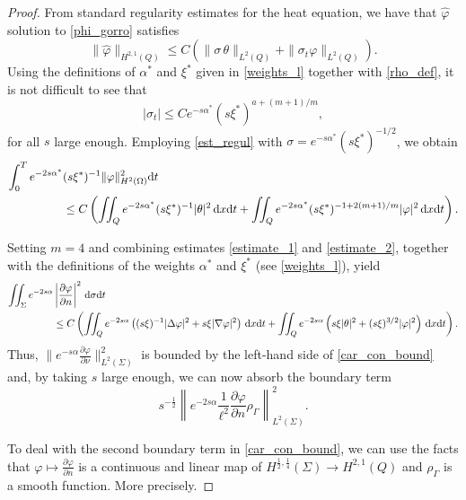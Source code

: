 \documentclass{aims}
\theoremstyle{definition}
\def\csbd{\rho_{\Gamma}}
\def\dx{\,\textnormal{d}x}
\def\dt{\textnormal{d}t}
\def\d{\,\textnormal{d}}
\begin{document}
\begin{proof}
From standard regularity estimates for the heat equation, we have that $\widehat{\varphi}$ solution to \eqref{phi_gorro} satisfies
%
\begin{equation}\label{est_regul}
\|\widehat{\varphi}\|_{H^{2,1}(Q)}\leq C\left(\|\sigma\,\theta\|_{L^2(Q)}+\|\sigma_t\varphi\|_{L^2(Q)}\right).
\end{equation}
%
Using the definitions of $\alpha^*$ and $\xi^*$ given in \eqref{weights_l} together with \eqref{rho_def}, it is not difficult to see that 
%
\begin{equation*}
|\sigma_t|\leq Ce^{-s\alpha^*}(s\xi^*)^{a+{(m+1)}/{m}},
\end{equation*}
%
for all $s$ large enough. Employing  \eqref{est_regul} with $\sigma=e^{-s\alpha^*}(s\xi^*)^{-1/2}$, we obtain
%
\begin{equation}\label{estimate_2}
\begin{split}
\int_{0}^T e^{-2s\alpha^*}&(s\xi^{*})^{-1}\|\varphi\|_{H^2(\Omega)}^2\dt \\
&\leq C\left(\iint_Qe^{-2s\alpha^*}(s\xi^*)^{-1}|\theta|^2\dx\dt+\iint_Qe^{-2s\alpha^*}(s\xi^*)^{-1+2(m+1)/m}|\varphi|^2\dx\dt\right).
\end{split}
\end{equation}

Setting $m=4$ and combining estimates \eqref{estimate_1} and \eqref{estimate_2}, together with the definitions of the weights $\alpha^*$ and $\xi^*$ (see \eqref{weights_l}), yield
%
\begin{equation*}
\begin{split}
\iint_{\Sigma}e^{-2s\alpha}&\left|\frac{\partial \varphi}{\partial n}\right|^2\d\sigma\dt\\
&\leq C\left(\iint_Q e^{-2s\alpha}\left((s\xi)^{-1}|\Delta \varphi|^2 + s\xi|\nabla \varphi|^2\right)\dx\dt+\iint_Qe^{-2s\alpha}\left(s\xi|\theta|^2+(s\xi)^{3/2}|\varphi|^2\right)\dx\dt\right).
\end{split}
\end{equation*}
%
Thus, $\|e^{-s\alpha}\frac{\partial \varphi}{\partial \nu}\|_{L^2(\Sigma)}^2$ is bounded by the left-hand side of \eqref{car_con_bound} and, by taking $s$ large enough, we can now absorb the boundary term 
%
\begin{equation*}
s^{-\frac{1}{2}}\left\| e^{-2s\alpha} \frac{1}{\ell^2}\frac{\partial \varphi}{\partial n} \csbd \right\|^{2}_{L^2(\Sigma)}.
\end{equation*}

To deal with the second boundary term in \eqref{car_con_bound}, we can use the facts that $\varphi \mapsto \frac{\partial \varphi }{\partial n}$ is a continuous and linear map of $H^{\frac12,\frac14}(\Sigma)\to H^{2,1}(Q)$ and $\csbd$ is a smooth function. More precisely. 


\end{proof}
\end{document}
